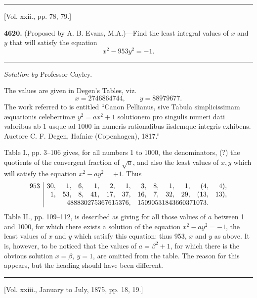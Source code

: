 \documentclass[10pt,twoside]{article}
\begin{document}
\begin{center}
\rule{0.32\linewidth}{0.4pt}

[Vol. xxii., pp. 78, 79.]
\end{center}

\noindent\textbf{4620.} (Proposed by A. B. Evans, M.A.)---Find the least
integral values of \(x\) and \(y\) that will satisfy the equation
\[
        x^2-953y^2=-1.
\]

\begin{center}
\rule{0.25\linewidth}{0.4pt}

\textit{Solution by} Professor Cayley.
\end{center}

The values are given in Degen's Tables, viz.
\[
        x=2746864744,\qquad y=88979677.
\]
The work referred to is entitled ``Canon Pellianus, sive Tabula simplicissimam
\ae quationis celeberrim\ae{} \(y^2=ax^2+1\) solutionem pro singulis numeri
dati valoribus ab 1 usque ad 1000 in numeris rationalibus iisdemque integris
exhibens. Auctore C. F. Degen, Hafni\ae{} (Copenhagen), 1817.''

\newpage

Table I., pp. 3--106 gives, for all numbers 1 to 1000, the denominators, (?)
the quotients of the convergent fraction of \(\sqrt a\), and also the least
values of \(x,y\) which will satisfy the equation \(x^2-ay^2=+1\). Thus
\[
\begin{array}{r|rrrrrrrrrrrr}
953&30,&1,&6,&1,&2,&1,&3,&8,&1,&1,&(4,&4),\\
   &1,&53,&8,&41,&17,&37,&16,&7,&32,&29,&(13,&13),\\
   &\multicolumn{6}{r}{488830275367615376,}&
    \multicolumn{6}{l}{15090531843660371073.}
\end{array}
\]
Table II., pp. 109--112, is described as giving for all those values of \(a\)
between 1 and 1000, for which there exists a solution of the equation
\(x^2-ay^2=-1\), the least values of \(x\) and \(y\) which satisfy this
equation: thus 953, \(x\) and \(y\) as above. It is, however, to be noticed
that the values of \(a=\beta^2+1\), for which there is the obvious solution
\(x=\beta,\ y=1\), are omitted from the table. The reason for this appears, but
the heading should have been different.

\begin{center}
\rule{0.32\linewidth}{0.4pt}

[Vol. xxiii., January to July, 1875, pp. 18, 19.]
\end{center}
\end{document}
